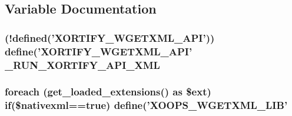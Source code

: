 \subsection{Variable Documentation}
\hypertarget{wgetxml_8php_a02a206e6186196633813b6d0fcab1556}{
\subsubsection[{\-\_\-\-R\-U\-N\-\_\-\-X\-O\-R\-T\-I\-F\-Y\-\_\-\-A\-P\-I\-\_\-\-X\-M\-L}]{ (!defined('X\-O\-R\-T\-I\-F\-Y\-\_\-\-W\-G\-E\-T\-X\-M\-L\-\_\-\-A\-P\-I')) define('X\-O\-R\-T\-I\-F\-Y\-\_\-\-W\-G\-E\-T\-X\-M\-L\-\_\-\-A\-P\-I' \-\_\-\-R\-U\-N\-\_\-\-X\-O\-R\-T\-I\-F\-Y\-\_\-\-A\-P\-I\-\_\-\-X\-M\-L}}\label{wgetxml_8php_a02a206e6186196633813b6d0fcab1556}
\hypertarget{wgetxml_8php_a121ad903444481b9834116cef5ea2f4d}{
\subsubsection[{if}]{\setlength{\rightskip}{0pt plus 5cm}foreach (get\-\_\-loaded\-\_\-extensions() as \$ext) if(\$nativexml==true) define('X\-O\-O\-P\-S\-\_\-\-W\-G\-E\-T\-X\-M\-L\-\_\-\-L\-I\-B'}}\label{wgetxml_8php_a121ad903444481b9834116cef5ea2f4d}
